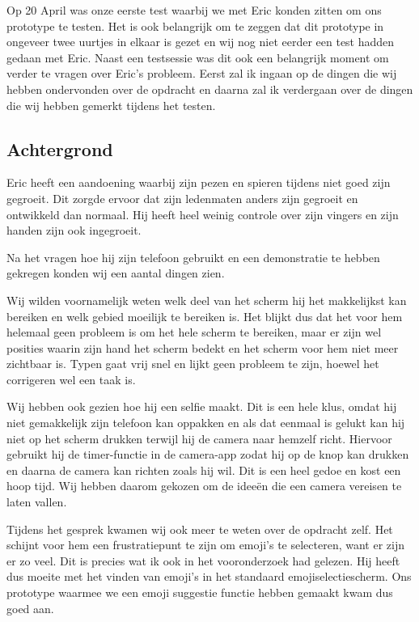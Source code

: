 \documentclass[12pt]{article}
\begin{document}
Op 20 April was onze eerste test waarbij we met Eric konden zitten om ons prototype te testen.
Het is ook belangrijk om te zeggen dat dit prototype in ongeveer twee uurtjes in elkaar is gezet en wij nog niet eerder een test hadden gedaan met Eric.
Naast een testsessie was dit ook een belangrijk moment om verder te vragen over Eric's probleem.
Eerst zal ik ingaan op de dingen die wij hebben ondervonden over de opdracht en daarna zal ik verdergaan over de dingen die wij hebben gemerkt tijdens het testen.


\subsection{Achtergrond}

Eric heeft een aandoening waarbij zijn pezen en spieren tijdens niet goed zijn gegroeit.
Dit zorgde ervoor dat zijn ledenmaten anders zijn gegroeit en ontwikkeld dan normaal.
Hij heeft heel weinig controle over zijn vingers en zijn handen zijn ook ingegroeit.

Na het vragen hoe hij zijn telefoon gebruikt en een demonstratie te hebben gekregen konden wij een aantal dingen zien.

Wij wilden voornamelijk weten welk deel van het scherm hij het makkelijkst kan bereiken en welk gebied moeilijk te bereiken is.
Het blijkt dus dat het voor hem helemaal geen probleem is om het hele scherm te bereiken, maar er zijn wel posities waarin zijn hand het scherm bedekt en het scherm voor hem niet meer zichtbaar is.
Typen gaat vrij snel en lijkt geen probleem te zijn, hoewel het corrigeren wel een taak is.

Wij hebben ook gezien hoe hij een selfie maakt.
Dit is een hele klus, omdat hij niet gemakkelijk zijn telefoon kan oppakken en als dat eenmaal is gelukt kan hij niet op het scherm drukken terwijl hij de camera naar hemzelf richt.
Hiervoor gebruikt hij de timer-functie in de camera-app zodat hij op de knop kan drukken en daarna de camera kan richten zoals hij wil.
Dit is een heel gedoe en kost een hoop tijd.
Wij hebben daarom gekozen om de ideeën die een camera vereisen te laten vallen.

Tijdens het gesprek kwamen wij ook meer te weten over de opdracht zelf.
Het schijnt voor hem een frustratiepunt te zijn om emoji's te selecteren, want er zijn er zo veel.
Dit is precies wat ik ook in het vooronderzoek had gelezen.
Hij heeft dus moeite met het vinden van emoji's in het standaard emojiselectiescherm.
Ons prototype waarmee we een emoji suggestie functie hebben gemaakt kwam dus goed aan.
\end{document}
